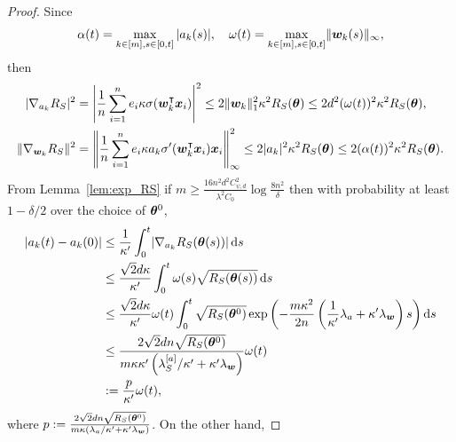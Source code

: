 \documentclass{article}
\begin{document}
\begin{proof}
    Since
    \begin{equation}
        \alpha(t)=\max\limits_{k\in[m],s\in[0,t]}|a_k(s)|, \quad \omega(t)=\max\limits_{k\in[m],s\in[0,t]}\lVert\bm{w}_k(s)\rVert_{\infty},
    \end{equation}
    then
    \begin{equation}
        \begin{aligned}
            \lvert\nabla_{a_k}R_S\rvert^2    & =\left\lvert\frac{1}{n}\sum_{i=1}^n e_i\kappa\sigma(\bm{w}_k^\intercal\bm{x}_i)\right\rvert^2\leq 2\lVert\bm{w}_k\rVert^2_1\kappa^2R_S(\bm{\theta})\leq 2d^2(\omega(t))^2\kappa^2R_S(\bm{\theta}),            \\
            \lVert\nabla_{\bm{w}_k}R_S\rVert^2 & =\left\lVert\frac{1}{n}\sum_{i=1}^n e_i\kappa a_k\sigma'(\bm{w}_k^\intercal\bm{x}_i)\bm{x}_i\right\rVert^2_{\infty}\leq 2\lvert a_k\rvert^2\kappa^2R_S(\bm{\theta})\leq 2(\alpha(t))^2\kappa^2R_S(\bm{\theta}).
        \end{aligned}
    \end{equation}
    From Lemma~\ref{lem:exp_RS} if $m\geq \frac{16n^2d^2C_{\psi,d}^2}{\lambda^2C_0}\log\frac{8n^2}{\delta}$ then with probability at least $1 - \delta/2$ over the choice of $\bm{\theta}^0$,
    \begin{equation}
        \begin{aligned}
            \lvert a_k(t) - a_k(0)\rvert
             & \leq\frac{1}{\kappa'}\int_0^t\lvert\nabla_{a_k}R_S(\bm{\theta}(s))\rvert\mathop{}\!\mathrm{d}{s}                                                                                                                   \\
             & \leq\frac{\sqrt{2}d\kappa}{\kappa'}\int_{0}^{t} \omega(s)\sqrt{R_S(\bm{\theta}(s))}\mathop{}\!\mathrm{d}{s}                                                                                                  \\
             & \leq\frac{\sqrt{2}d\kappa}{\kappa'}\omega(t)\int_{0}^{t}\sqrt{R_S(\bm{\theta}^0)}\exp\left(-\frac{m\kappa^2}{2n}\left(\frac{1}{\kappa'}\lambda_a+\kappa'\lambda_{\bm{w}}\right)s\right)\mathop{}\!\mathrm{d}{s} \\
             & \leq \frac{2\sqrt{2}dn\sqrt{R_S(\bm{\theta}^0)}}{m\kappa\kappa'\left(\lambda^{[a]}_S/\kappa'+\kappa'\lambda_{\bm{w}}\right)}\omega(t)                                                           \\
             & :=\frac{p}{\kappa'}\omega(t),
        \end{aligned}
    \end{equation}
    where $p := \frac{2\sqrt{2}dn\sqrt{R_S(\bm{\theta}^0)}}{m\kappa\left(\lambda_a/\kappa'+\kappa'\lambda_{\bm{w}}\right)}$. On the other hand,

\end{proof}
\end{document}
